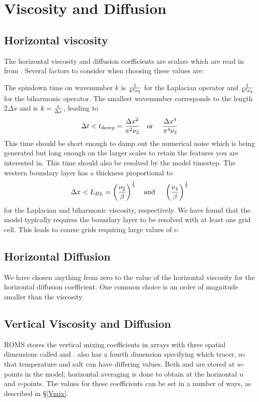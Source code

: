 \section{Viscosity and Diffusion}
\label{Nu}

\subsection{Horizontal viscosity}
The horizontal viscosity and diffusion coefficients are scalars which
are read in from .  Several
factors to consider when choosing these values are:
\begin{klist}
     The spindown time on wavenumber $k$ is ${1
   \over k^2 \nu_2}$ for the Laplacian operator and ${1 \over k^4
   \nu_4}$ for the biharmonic operator.  The smallest wavenumber
   corresponds to the length $2 \Delta x$ and is $k = {\pi \over
   \Delta x}$, leading to
\begin{equation}
    \Delta t < t_{damp} = {\Delta x^2 \over \pi^2 \nu_2}
    \mbox{\quad or \quad} {\Delta x^4 \over \pi^4 \nu_4}
\end{equation}
This time should be short enough to damp out the numerical noise
which is being generated but long enough on the larger scales to
retain the features you are interested in.  This time should also be
resolved by the model timestep.
    The western boundary layer has a
   thickness proportional to 
\begin{equation}
    \Delta x < L_{BL} = \left( {\nu_2 \over \beta} \right)^{1 \over 3}
    \mbox{\quad and \quad}
    \left( {\nu_4 \over \beta} \right)^{1 \over 5}
\end{equation}
for the Laplacian and biharmonic viscosity, respectively.  We have
found that the model typically requires the boundary layer to be
resolved with at least one grid cell.  This leads to coarse grids
requiring large values of $\nu$.
\end{klist}

\subsection{Horizontal Diffusion}
We have chosen anything from zero to the value of the horizontal
viscosity for the horizontal diffusion coefficient.  One common choice
is an order of magnitude smaller than the viscosity.

\subsection{Vertical Viscosity and Diffusion}
ROMS stores the vertical mixing coefficients in arrays with three
spatial dimensions called
 and .   also has a fourth dimension
specifying which tracer, so
that temperature and salt can have differing values.  Both 
and  are stored at $w$-points in the model;
horizontal averaging is done to obtain  at the horizontal $u$
and $v$-points.  The values for these coefficients can be set in a
number of ways, as described in \S\ref{Vmix}.
